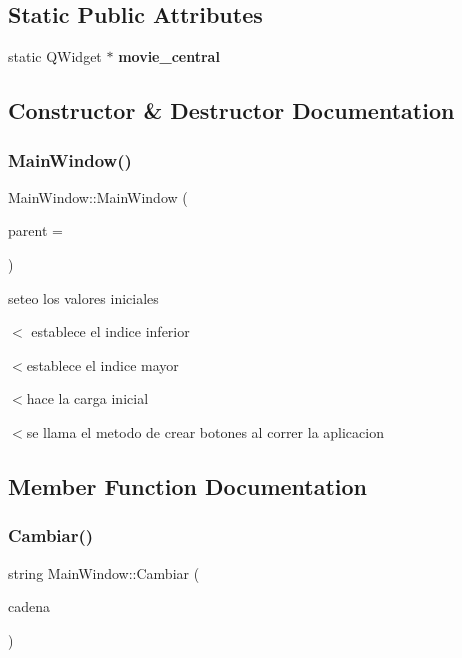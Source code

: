 \subsection*{Static Public Attributes}
\begin{DoxyCompactItemize}
\item 
\mbox{\label{classMainWindow_aeb6e8a0d7fe4332871217ebda0143faf}} 
static Q\+Widget $\ast$ {\bfseries movie\+\_\+central}
\end{DoxyCompactItemize}


\subsection{Constructor \& Destructor Documentation}
\mbox{\label{classMainWindow_a8b244be8b7b7db1b08de2a2acb9409db}} 
\subsubsection{\texorpdfstring{Main\+Window()}{MainWindow()}}
{\footnotesize\ttfamily Main\+Window\+::\+Main\+Window (\begin{DoxyParamCaption}\item[{Q\+Widget $\ast$}]{parent = {} }\end{DoxyParamCaption})\hspace{0.3cm}{\ttfamily [explicit]}}

seteo los valores iniciales

$<$ establece el indice inferior

$<$establece el indice mayor

$<$hace la carga inicial

$<$se llama el metodo de crear botones al correr la aplicacion 

\subsection{Member Function Documentation}
\mbox{\label{classMainWindow_abc32b15541cc089bb38675046b2d6f36}} 
\subsubsection{\texorpdfstring{Cambiar()}{Cambiar()}}
{\footnotesize\ttfamily string Main\+Window\+::\+Cambiar (\begin{DoxyParamCaption}\item[{string}]{cadena }\end{DoxyParamCaption})}



